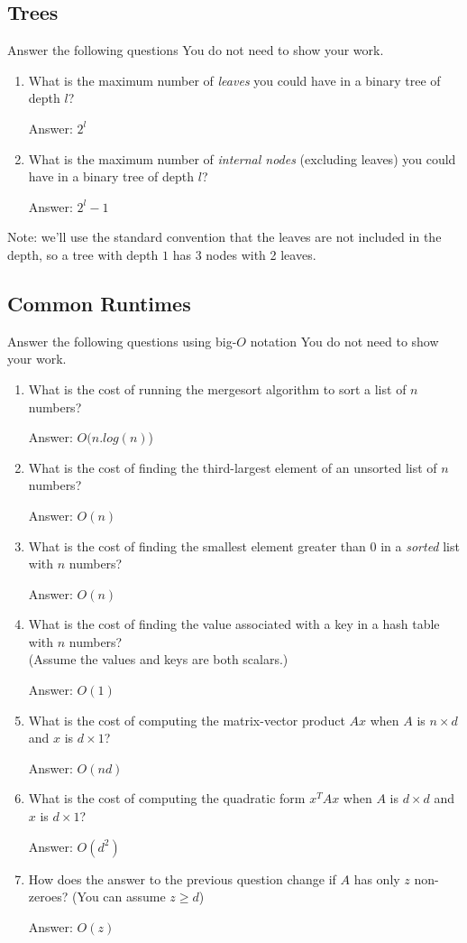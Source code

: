 \documentclass{article}
\def\ans#1{\par\gre{Answer: #1}}
\def\blu#1{{\color{blu}#1}}
\def\gre#1{{\color{gre}#1}}
\begin{document}
\subsection{Trees}

\blu{Answer the following questions} You do not need to show your work.
\begin{enumerate}
\item What is the maximum number of \emph{leaves} you could have in a binary tree of depth $l$?
\ans{$2^l$}
\item What is the maximum number of \emph{internal nodes} (excluding leaves) you could have in a binary tree of depth $l$?
\ans{$2^l-1$}
\end{enumerate}
Note: we'll use the standard convention that the leaves are not included in the depth, so a tree with depth $1$ has 3 nodes with 2 leaves.

\subsection{Common Runtimes}

\blu{Answer the following questions using big-$O$ notation} You do not need to show your work.
\begin{enumerate}
\item What is the cost of running the mergesort algorithm to sort  a list of $n$ numbers?
\ans{$O(n.log(n)$)}
\item What is the cost of finding the third-largest element of an unsorted list of $n$ numbers?
\ans{$O(n)$}
\item What is the cost of finding the smallest element greater than 0 in a \emph{sorted} list with $n$ numbers?
\ans{$O(n)$}
\item What is the cost of finding the value associated with a key in a hash table with $n$ numbers? \\(Assume the values and keys are both scalars.)
\ans{$O(1)$}
\item What is the cost of computing the matrix-vector product $Ax$ when $A$ is $n \times d$ and $x$ is $d \times 1$?
\ans{$O(nd)$}
\item What is the cost of computing the quadratic form $x^TAx$ when $A$ is $d \times d$ and $x$ is $d \times 1$?
\ans{$O(d^2)$}
\item How does the answer to the previous question change if $A$ has only $z$ non-zeroes? (You can assume $z \geq d$)
\ans{$O(z)$}
\end{enumerate}
\end{document}
